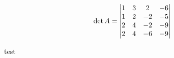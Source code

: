 \documentclass{article}
\begin{document}
$$\det A =
\begin{vmatrix}
1 & 3 & 2 & -6 \\ 
1 & 2 & -2 & -5 \\ 
2 & 4 & -2 & -9 \\ 
2 & 4 & -6 & -9  \notag
\end{vmatrix}
$$

test
\end{document}
